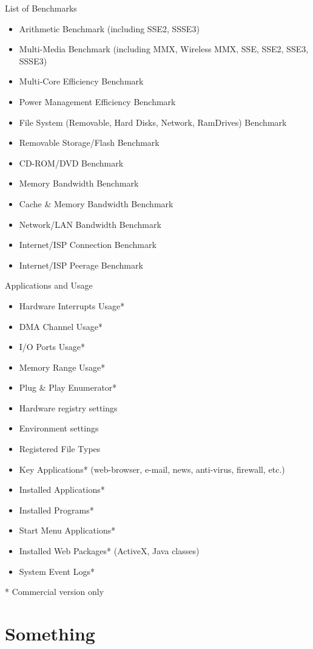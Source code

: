 List of Benchmarks
\begin{itemize}
    \item Arithmetic Benchmark (including SSE2, SSSE3)
    \item Multi-Media Benchmark (including MMX, Wireless MMX, SSE, SSE2, SSE3, SSSE3)
    \item Multi-Core Efficiency Benchmark
    \item Power Management Efficiency Benchmark
    \item File System (Removable, Hard Disks, Network, RamDrives) Benchmark
    \item Removable Storage/Flash Benchmark
    \item CD-ROM/DVD Benchmark
    \item Memory Bandwidth Benchmark
    \item Cache \& Memory Bandwidth Benchmark
    \item Network/LAN Bandwidth Benchmark
    \item Internet/ISP Connection Benchmark
    \item Internet/ISP Peerage Benchmark 
\end{itemize}
    
Applications and Usage
\begin{itemize}
    \item Hardware Interrupts Usage*
    \item DMA Channel Usage*
    \item I/O Ports Usage*
    \item Memory Range Usage*
    \item Plug \& Play Enumerator*
    \item Hardware registry settings
    \item Environment settings
    \item Registered File Types
    \item Key Applications* (web-browser, e-mail, news, anti-virus, firewall, etc.)
    \item Installed Applications*
    \item Installed Programs*
    \item Start Menu Applications*
    \item Installed Web Packages* (ActiveX, Java classes)
    \item System Event Logs* 
\end{itemize}
* Commercial version only
    
\chapter{Something} \label{app:something}


